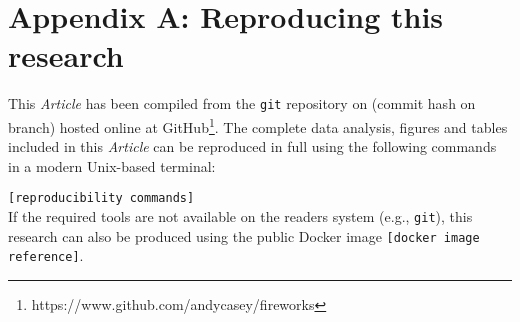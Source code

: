 \documentclass[useAMS,usenatbib]{mn2e}
\newcommand\article{\textit{Article}}
\begin{document}
\label{lastpage}

\section{Appendix A: Reproducing this research}
This \article{} has been compiled from the \texttt{git} repository on \gitAuthorDate{} (commit hash \texttt{\gitAbbrevHash} on \texttt{\gitBranch} branch) hosted online at GitHub\footnote{https://www.github.com/andycasey/fireworks}. The complete data analysis, figures and tables included in this \article{} can be reproduced in full using the following commands in a modern Unix-based terminal:
\vspace{0.5em}

\noindent\texttt{[reproducibility commands]} 
\vspace{0.5em} \\
If the required tools are not available on the readers system (e.g., \texttt{git}), this research can also be produced using the public Docker image \texttt{[docker image reference]}.
\end{document}
